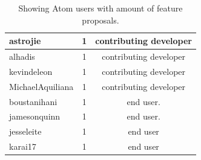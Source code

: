 \documentclass[a4paper,11pt]{article}
\begin{document}
{\begin{table}[h]
\begin{tabular}{ | l | c | c |}
		astrojie	 		& 1		 				& contributing developer	\\\hline
		alhadis	 		& 1		 				& contributing developer	\\\hline
		kevindeleon	 	& 1		 				& contributing developer	\\\hline
		MichaelAquiliana	& 1		 				& contributing developer	\\\hline
		boustanihani	 	& 1		 				& end user. 			\\\hline
		jamesonquinn	 	& 1		 				& end user. 			\\\hline
		jesseleite	 		& 1		 				& end user			\\\hline
		karai17	 		& 1		 				& end user			\\
		\hline
	\end{tabular}
	\caption{Showing Atom users with amount of feature proposals.}
	\label{tab:proposals_atom}
\end{table}

}
\end{document}
